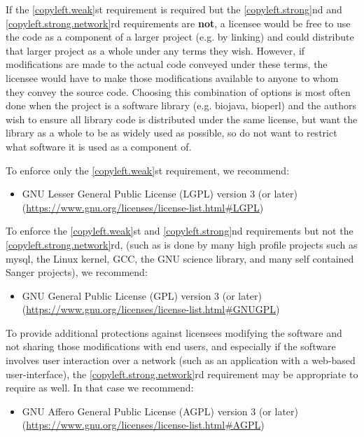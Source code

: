 \documentclass[10pt,a4paper]{article}
\begin{document}
If the \ref{copyleft.weak}st requirement is required but the \ref{copyleft.strong}nd and 
\ref{copyleft.strong.network}rd requirements are \textbf{not}, a licensee would be free 
to use the code as a component of a larger project (e.g. by linking) and could distribute 
that larger project as a whole under any terms they wish. However, if modifications are 
made to the actual code conveyed under these terms, the licensee would have to make 
those modifications available to anyone to whom they convey the source code. 
Choosing this combination of options is most often done when the project is a software 
library (e.g. biojava, bioperl) and the authors wish to ensure all library code is distributed 
under the same license, but want the library as a whole to be as widely used as possible, 
so do not want to restrict what software it is used as a component of. 

To enforce only the \ref{copyleft.weak}st requirement, we recommend:
\begin{itemize}
\item GNU Lesser General Public License (LGPL) version 3 (or later) (\url{https://www.gnu.org/licenses/license-list.html#LGPL})
\end{itemize}

To enforce the \ref{copyleft.weak}st and \ref{copyleft.strong}nd requirements but not the 
\ref{copyleft.strong.network}rd, (such as is done by many high profile projects such as 
mysql, the Linux kernel, GCC, the GNU science library, and many self contained Sanger 
projects), we recommend:
\begin{itemize}
\item GNU General Public License (GPL) version 3 (or later) (\url{https://www.gnu.org/licenses/license-list.html#GNUGPL})
\end{itemize}

To provide additional protections against licensees modifying the software and not sharing 
those modifications with end users, and especially if the software involves user interaction 
over a network (such as an application with a web-based user-interface), the 
\ref{copyleft.strong.network}rd requirement may be appropriate to require as well. 
In that case we recommend:
\begin{itemize}
\item GNU Affero General Public License (AGPL) version 3 (or later) (\url{https://www.gnu.org/licenses/license-list.html#AGPL})
\end{itemize}
\end{document}
